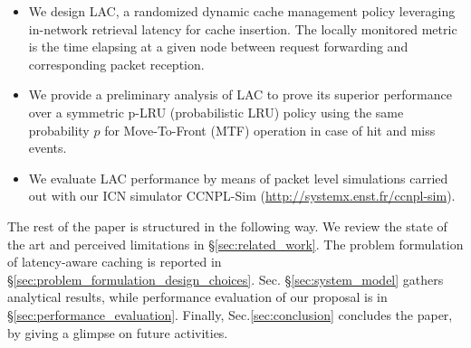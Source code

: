 \documentclass[conference]{IEEEtran}
\begin{document}
\begin{itemize}
\item We design LAC, a randomized dynamic cache management 
policy leveraging in-network retrieval latency for cache 
insertion. The locally monitored metric is the time elapsing 
at a given node between request forwarding and corresponding 
packet reception.

\item We provide a preliminary analysis of LAC
to prove its superior performance over a symmetric p-LRU 
(probabilistic LRU) policy using 
the same probability $p$ for Move-To-Front (MTF) operation in 
case of hit and miss events. 

\item We evaluate LAC performance
by means of packet level simulations carried out with our ICN simulator CCNPL-Sim (\url{http://systemx.enst.fr/ccnpl-sim}). 
\end{itemize}

The rest of the paper is structured in the following way. We 
review the state of the art and perceived limitations in 
\S\ref{sec:related_work}. The problem formulation of 
latency-aware caching is reported in 
\S\ref{sec:problem_formulation_design_choices}.
Sec. \S\ref{sec:system_model} gathers analytical results, 
while performance evaluation of our proposal is in 
\S\ref{sec:performance_evaluation}.
Finally, Sec.\ref{sec:conclusion} concludes the paper, by 
giving a glimpse on future activities.
\end{document}
